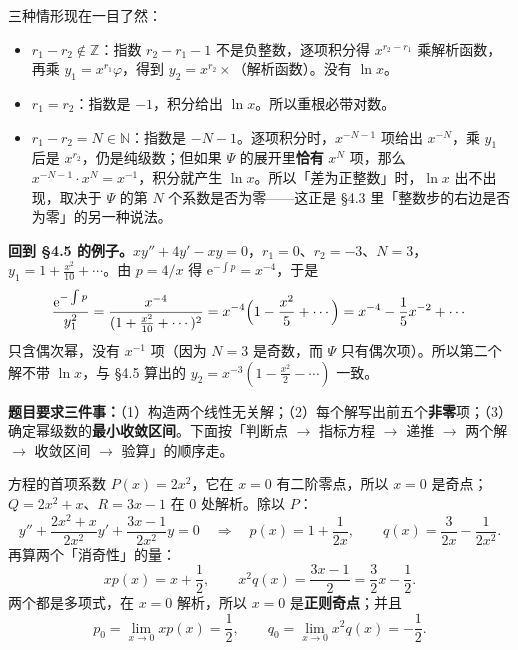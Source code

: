 \documentclass[11pt]{ctexart}
\let\orighdr\hdr
\renewcommand{\hdr}[2]{\needspace{6\baselineskip}\orighdr{#1}{#2}}
\let\origsubhdr\subhdr
\renewcommand{\subhdr}[1]{\needspace{3\baselineskip}\origsubhdr{#1}}
\newcommand{\ee}{\mathrm{e}}
\newcommand{\Z}{\mathbb{Z}}
\newcommand{\N}{\mathbb{N}}
\begin{document}
三种情形现在一目了然：
\begin{itemize}
  \item \textbf{$r_1-r_2\notin\Z$}：指数 $r_2-r_1-1$ 不是负整数，逐项积分得 $x^{r_2-r_1}$ 乘解析函数，再乘 $y_1=x^{r_1}\varphi$，得到 $y_2=x^{r_2}\times$（解析函数）。没有 $\ln x$。
  \item \textbf{$r_1=r_2$}：指数是 $-1$，积分给出 $\ln x$。所以重根必带对数。
  \item \textbf{$r_1-r_2=N\in\N$}：指数是 $-N-1$。逐项积分时，$x^{-N-1}$ 项给出 $x^{-N}$，乘 $y_1$ 后是 $x^{r_2}$，仍是纯级数；但如果 $\Psi$ 的展开里\textbf{恰有} $x^N$ 项，那么 $x^{-N-1}\cdot x^N=x^{-1}$，积分就产生 $\ln x$。所以「差为正整数」时，$\ln x$ 出不出现，取决于 $\Psi$ 的第 $N$ 个系数是否为零——这正是 §4.3 里「整数步的右边是否为零」的另一种说法。
\end{itemize}

\textbf{回到 §4.5 的例子。}$xy''+4y'-xy=0$，$r_1=0$、$r_2=-3$、$N=3$，$y_1=1+\frac{x^2}{10}+\cdots$。由 $p=4/x$ 得 $\ee^{-\int p}=x^{-4}$，于是
\[
\frac{\ee^{-\int p}}{y_1^2}=\frac{x^{-4}}{(1+\frac{x^2}{10}+\cdots)^2}
=x^{-4}\Bigl(1-\frac{x^2}{5}+\cdots\Bigr)
=x^{-4}-\frac15x^{-2}+\cdots
\]
只含偶次幂，没有 $x^{-1}$ 项（因为 $N=3$ 是奇数，而 $\Psi$ 只有偶次项）。所以第二个解不带 $\ln x$，与 §4.5 算出的 $y_2=x^{-3}(1-\frac{x^2}{2}-\cdots)$ 一致。


\qbreak
{}


\textbf{题目要求三件事：}（1）构造两个线性无关解；（2）每个解写出前五个\textbf{非零}项；（3）确定幂级数的\textbf{最小收敛区间}。下面按「判断点 $\to$ 指标方程 $\to$ 递推 $\to$ 两个解 $\to$ 收敛区间 $\to$ 验算」的顺序走。


方程的首项系数 $P(x)=2x^2$，它在 $x=0$ 有二阶零点，所以 $x=0$ 是奇点；$Q=2x^2+x$、$R=3x-1$ 在 $0$ 处解析。除以 $P$：
\[
y''+\frac{2x^2+x}{2x^2}y'+\frac{3x-1}{2x^2}y=0
\quad\Longrightarrow\quad
p(x)=1+\frac{1}{2x},\qquad q(x)=\frac{3}{2x}-\frac{1}{2x^2}.
\]
再算两个「消奇性」的量：
\[
xp(x)=x+\frac12,\qquad x^2q(x)=\frac{3x-1}{2}=\frac32x-\frac12 .
\]
两个都是多项式，在 $x=0$ 解析，所以 $x=0$ 是\textbf{正则奇点}；并且
\[
p_0=\lim_{x\to0}xp(x)=\frac12,\qquad q_0=\lim_{x\to0}x^2q(x)=-\frac12 .
\]
\end{document}
